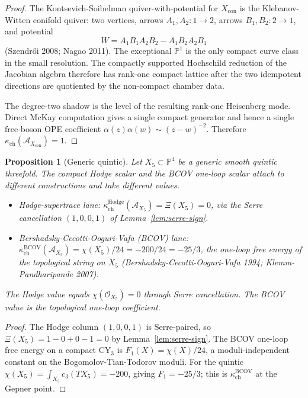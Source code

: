 \documentclass[11pt]{article}
\newtheorem{proposition}[theorem]{Proposition}
\providecommand{\cA}{\mathcal{A}}
\providecommand{\cO}{\mathcal{O}}
\begin{document}
\begin{proof}
The Kontsevich-Soibelman quiver-with-potential for $X_{\mathrm{con}}$
is the Klebanov-Witten conifold quiver: two vertices, arrows
\(A_1,A_2\colon 1\to2\), arrows \(B_1,B_2\colon 2\to1\), and potential
\[
   W=A_1B_1A_2B_2-A_1B_2A_2B_1
\]
(Szendr\H{o}i 2008; Nagao 2011). The exceptional
\(\mathbb P^1\) is the only compact curve class in the small resolution.
The compactly supported Hochschild reduction of the Jacobian algebra
therefore has rank-one compact lattice after the two idempotent
directions are quotiented by the non-compact chamber data.

The degree-two shadow is the level of the resulting rank-one Heisenberg
mode. Direct McKay computation gives a single compact generator and
hence a single free-boson OPE coefficient
\(\alpha(z)\alpha(w)\sim (z-w)^{-2}\). Therefore
\(\kappa_{\mathrm{ch}}(\cA_{X_{\mathrm{con}}})=1\).
\end{proof}

\begin{proposition}[Generic quintic]
\label{prop:quintic}
Let $X_{5}\subset\mathbb{P}^{4}$ be a generic smooth quintic threefold.
The compact Hodge scalar and the BCOV one-loop scalar attach to
different constructions and take different values.
\begin{itemize}
\item Hodge-supertrace lane:
      $\kappa_{\mathrm{ch}}^{\mathrm{Hodge}}(\cA_{X_{5}})=\Xi(X_{5})=0$,
      via the Serre cancellation $(1,0,0,1)$ of
      Lemma~\ref{lem:serre-sign}.
\item Bershadsky-Cecotti-Ooguri-Vafa (BCOV) lane:
      $\kappa_{\mathrm{ch}}^{\mathrm{BCOV}}(\cA_{X_{5}})=\chi(X_{5})/24=-200/24=-25/3$,
      the one-loop free energy of the topological string on $X_{5}$
      (Bershadsky-Cecotti-Ooguri-Vafa 1994; Klemm-Pandharipande 2007).
\end{itemize}
The Hodge value equals $\chi(\cO_{X_{5}})=0$ through Serre cancellation.
The BCOV value is the topological one-loop coefficient.
\end{proposition}

\begin{proof}
The Hodge column $(1,0,0,1)$ is Serre-paired, so
$\Xi(X_{5})=1-0+0-1=0$ by Lemma~\ref{lem:serre-sign}. The BCOV one-loop
free energy on a compact CY$_{3}$ is
$F_{1}(X)=\chi(X)/24$, a moduli-independent constant on the
Bogomolov-Tian-Todorov moduli. For the quintic
$\chi(X_{5})=\int_{X_{5}}c_{3}(TX_{5})=-200$, giving $F_{1}=-25/3$; this
is $\kappa_{\mathrm{ch}}^{\mathrm{BCOV}}$ at the Gepner point.
\end{proof}
\end{document}
